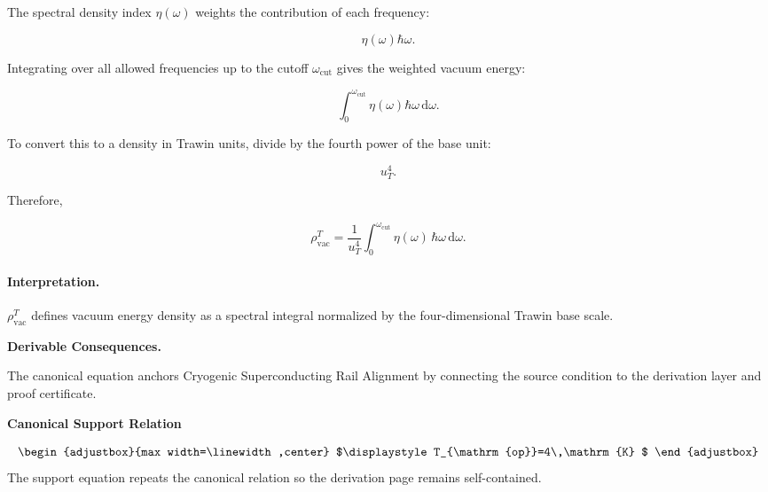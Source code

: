 The spectral density index $\eta(\omega)$ weights the contribution of each frequency:

\begin{equation}
\eta(\omega)\hbar\omega .
\end{equation}

Integrating over all allowed frequencies up to the cutoff $\omega_{\mathrm{cut}}$ gives the weighted vacuum energy:

\begin{equation}
\int_{0}^{\omega_{\mathrm{cut}}}
\eta(\omega)\hbar\omega\,\mathrm{d}\omega .
\end{equation}

To convert this to a density in Trawin units, divide by the fourth power of the base unit:

\begin{equation}
u_T^4 .
\end{equation}

Therefore,

\begin{equation}
\boxed{
\rho_{\mathrm{vac}}^{T}
=
\frac{1}{u_T^4}
\int_{0}^{\omega_{\mathrm{cut}}}
\eta(\omega)\,
\hbar\omega\,
\mathrm{d}\omega .
}
\end{equation}

\paragraph{Interpretation.}
$\rho_{\mathrm{vac}}^{T}$ defines vacuum energy density as a spectral integral normalized by the four-dimensional Trawin base scale.

\par\vspace{0.35em}
\noindent\textbf{Derivable Consequences.}\quad
\begingroup
\footnotesize
\raggedright
The canonical equation anchors Cryogenic Superconducting Rail Alignment by connecting the source condition to the derivation layer and proof certificate.
\par\endgroup

\noindent\textbf{Canonical Support Relation}\par
\[
\begin{adjustbox}{max width=\linewidth,center}
$\displaystyle
T_{\mathrm{op}}=4\,\mathrm{K}
$
\end{adjustbox}
\]
\noindent The support equation repeats the canonical relation so the derivation page remains self-contained.\par

